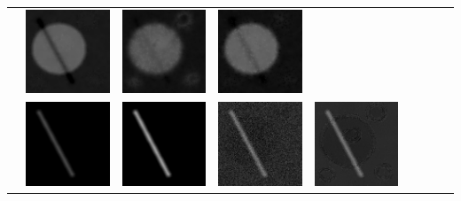 \begin{tabular}{M{0.02cm}*{8}{M{2.5cm}}}
        &\includegraphics[width=\figurelength]{img/chapitre3/figure7/maps/img_7_2.png}
        &\includegraphics[width=\figurelength]{img/chapitre3/figure7/maps/img_8_2.png}
        &\includegraphics[width=\figurelength]{img/chapitre3/figure7/maps/img_9_2.png}\\
        &\includegraphics[width=\figurelength]{img/chapitre3/figure7/maps/img_1_3.png}
        &\includegraphics[width=\figurelength]{img/chapitre3/figure7/maps/img_2_3.png}
        &\includegraphics[width=\figurelength]{img/chapitre3/figure7/maps/img_3_3.png}
        &\includegraphics[width=\figurelength]{img/chapitre3/figure7/maps/img_4_3.png}

\end{tabular}
